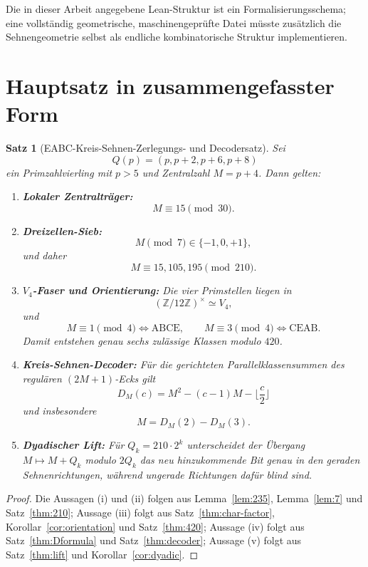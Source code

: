 \documentclass[11pt,a4paper]{article}
\newtheorem{satz}{Satz}[section]
\theoremstyle{definition}
\theoremstyle{remark}
\newcommand{\Z}{\mathbb Z}
\newcommand{\ABCE}{\mathrm{ABCE}}
\newcommand{\CEAB}{\mathrm{CEAB}}
\begin{document}
Die in dieser Arbeit angegebene Lean-Struktur ist ein Formalisierungsschema; eine vollständig geometrische, maschinengeprüfte Datei müsste zusätzlich die Sehnengeometrie selbst als endliche kombinatorische Struktur implementieren.

\section{Hauptsatz in zusammengefasster Form}

\begin{satz}[EABC-Kreis-Sehnen-Zerlegungs- und Decodersatz]\label{thm:main}
Sei
\[
Q(p)=(p,p+2,p+6,p+8)
\]
ein Primzahlvierling mit $p>5$ und Zentralzahl $M=p+4$. Dann gelten:

\begin{enumerate}[label=\textup{(\roman*)}]
\item \textbf{Lokaler Zentralträger:}
\[
M\equiv15\pmod{30}.
\]

\item \textbf{Dreizellen-Sieb:}
\[
M\pmod7\in\{-1,0,+1\},
\]
und daher
\[
M\equiv15,105,195\pmod{210}.
\]

\item \textbf{$V_4$-Faser und Orientierung:}
Die vier Primstellen liegen in
\[
(\Z/12\Z)^\times\simeq V_4,
\]
und
\[
M\equiv1\pmod4\iff\ABCE,
\qquad
M\equiv3\pmod4\iff\CEAB.
\]
Damit entstehen genau sechs zulässige Klassen modulo $420$.

\item \textbf{Kreis-Sehnen-Decoder:}
Für die gerichteten Parallelklassensummen des regulären $(2M+1)$-Ecks gilt
\[
D_M(c)=M^2-(c-1)M-\Big\lfloor\frac c2\Big\rfloor
\]
und insbesondere
\[
\boxed{M=D_M(2)-D_M(3).}
\]

\item \textbf{Dyadischer Lift:}
Für $Q_k=210\cdot2^k$ unterscheidet der Übergang $M\mapsto M+Q_k$ modulo $2Q_k$ das neu hinzukommende Bit genau in den geraden Sehnenrichtungen, während ungerade Richtungen dafür blind sind.
\end{enumerate}
\end{satz}

\begin{proof}
Die Aussagen (i) und (ii) folgen aus Lemma~\ref{lem:235}, Lemma~\ref{lem:7} und Satz~\ref{thm:210}; Aussage (iii) folgt aus Satz~\ref{thm:char-factor}, Korollar~\ref{cor:orientation} und Satz~\ref{thm:420}; Aussage (iv) folgt aus Satz~\ref{thm:Dformula} und Satz~\ref{thm:decoder}; Aussage (v) folgt aus Satz~\ref{thm:lift} und Korollar~\ref{cor:dyadic}.
\end{proof}
\end{document}
